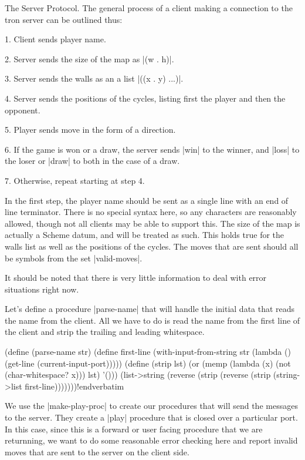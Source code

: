 The Server Protocol. The general process of a client making 
a connection to the tron server can be outlined thus:

{\medskip\narrower
\item{1.} Client sends player name.
\item{2.} Server sends the size of the map as |(w . h)|.
\item{3.} Server sends the walls as an a list |((x . y) ...)|.
\item{4.} Server sends the positions of the cycles, listing first the 
player and then the opponent.
\item{5.} Player sends move in the form of a direction.
\item{6.} If the game is won or a draw, the server sends |win| to 
the winner, and |loss| to the loser or |draw| to both in the case of 
a draw.
\item{7.} Otherwise, repeat starting at step 4.\par\medskip}

\noindent In the first step, the player name should be sent as a single 
line with an end of line terminator. There is no special syntax here, 
so any characters are reasonably allowed, though not all clients may be 
able to support this. 
The size of the map is actually a Scheme datum, and will be treated as 
such. This holds true for the walls list as well as the positions of 
the cycles. 
The moves that are sent should all be symbols from the set |valid-moves|. 

It should be noted that there is very little information to deal with 
error situations right now.


\fi

Let's define a procedure |parse-name| that will handle the initial 
data that reads the name from the client. All we have to do is read 
the name from the first line of the client and strip the trailing and 
leading whitespace.


\Y\B \verbatim
(define (parse-name str)
  (define first-line
    (with-input-from-string str
      (lambda () (get-line (current-input-port)))))
  (define (strip lst)
    (or (memp (lambda (x) (not (char-whitespace? x))) lst)
        '()))
  (list->string
    (reverse (strip (reverse (strip (string->list first-line)))))))!endverbatim  \par
\fi

We use the |make-play-proc| to create our procedures that will 
send the messages to the server. They create a |play| procedure 
that is closed over a particular port. In this case, since this 
is a forward or user facing procedure that we are returnning, 
we want to do some reasonable error checking here and report 
invalid moves that are sent to the server on the client side.

